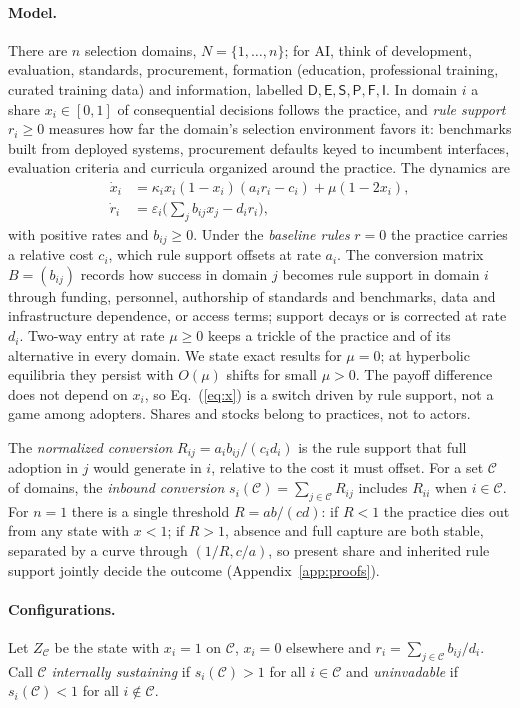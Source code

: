 \documentclass[letterpaper]{article} %
\theoremstyle{definition}
\newcommand{\dD}{\mathsf{D}}
\newcommand{\dE}{\mathsf{E}}
\newcommand{\dS}{\mathsf{S}}
\newcommand{\dP}{\mathsf{P}}
\newcommand{\dF}{\mathsf{F}}
\newcommand{\dI}{\mathsf{I}}
\newcommand{\cC}{\mathcal{C}}
\begin{document}
\paragraph{Model.} There are $n$ selection domains, $N=\{1,\dots,n\}$; for AI, think of development, evaluation, standards, procurement, formation (education, professional training, curated training data) and information, labelled $\dD,\dE,\dS,\dP,\dF,\dI$. In domain $i$ a share $x_i\in[0,1]$ of consequential decisions follows the practice, and \emph{rule support} $r_i\ge0$ measures how far the domain's selection environment favors it: benchmarks built from deployed systems, procurement defaults keyed to incumbent interfaces, evaluation criteria and curricula organized around the practice. The dynamics are
\begin{align}
\dot x_i&=\kappa_i x_i(1-x_i)(a_ir_i-c_i)+\mu(1-2x_i),\label{eq:x}\\
\dot r_i&=\varepsilon_i\Big(\textstyle\sum_{j}b_{ij}x_j-d_ir_i\Big),\label{eq:r}
\end{align}
with positive rates and $b_{ij}\ge0$. Under the \emph{baseline rules} $r=0$ the practice carries a relative cost $c_i$, which rule support offsets at rate $a_i$. The conversion matrix $B=(b_{ij})$ records how success in domain $j$ becomes rule support in domain $i$ through funding, personnel, authorship of standards and benchmarks, data and infrastructure dependence, or access terms; support decays or is corrected at rate $d_i$. Two-way entry at rate $\mu\ge0$ keeps a trickle of the practice and of its alternative in every domain. We state exact results for $\mu=0$; at hyperbolic equilibria they persist with $O(\mu)$ shifts for small $\mu>0$. The payoff difference does not depend on $x_i$, so Eq.~(\ref{eq:x}) is a switch driven by rule support, not a game among adopters. Shares and stocks belong to practices, not to actors.

The \emph{normalized conversion} $R_{ij}=a_ib_{ij}/(c_id_i)$ is the rule support that full adoption in $j$ would generate in $i$, relative to the cost it must offset. For a set $\cC$ of domains, the \emph{inbound conversion} $s_i(\cC)=\sum_{j\in\cC}R_{ij}$ includes $R_{ii}$ when $i\in\cC$. For $n=1$ there is a single threshold $R=ab/(cd)$: if $R<1$ the practice dies out from any state with $x<1$; if $R>1$, absence and full capture are both stable, separated by a curve through $(1/R,c/a)$, so present share and inherited rule support jointly decide the outcome (Appendix~\ref{app:proofs}).

\paragraph{Configurations.} Let $Z_\cC$ be the state with $x_i=1$ on $\cC$, $x_i=0$ elsewhere and $r_i=\sum_{j\in\cC}b_{ij}/d_i$. Call $\cC$ \emph{internally sustaining} if $s_i(\cC)>1$ for all $i\in\cC$ and \emph{uninvadable} if $s_i(\cC)<1$ for all $i\notin\cC$.
\end{document}
